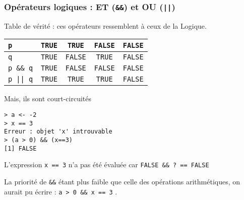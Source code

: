 \documentclass[10pt]{beamer}
\newcommand{\T}{\texttt{TRUE}}
\newcommand{\F}{\texttt{FALSE}}
\begin{document}


\begin{frame}[fragile]
  \frametitle{Opérateurs logiques : ET (\texttt{\&\&}) et OU (\texttt{||})}
  \begin{block}{Table de vérité : ces opérateurs ressemblent à ceux de la Logique.}
  \begin{table}
    \centering
    \begin{tabular}{|l|c|c|c|c|}
      \hline
      \texttt{p}        & \T & \T & \F & \F \\ \hline
      \texttt{q}        & \T & \F & \T & \F \\ \hline
      \texttt{p \&\& q} & \T & \F & \F & \F \\ \hline
      \texttt{p || q} & \T & \T & \T & \F \\ \hline
    \end{tabular}
  \end{table}
\end{block}


\begin{block}{Mais, ils sont court-circuités}
  \begin{lstlisting}[style=block]
> a <- -2
> x == 3
Erreur : objet 'x' introuvable
> (a > 0) && (x==3)
[1] FALSE    
\end{lstlisting}
L'expression \lstinline[columns=fixed]{x == 3} n'a pas été évaluée car \texttt{FALSE \&\& ? == FALSE}

La priorité de \texttt{\&\&} étant plus faible que celle des opérations arithmétiques,
on aurait pu écrire : \lstinline[columns=fixed]{a > 0 && x == 3} .

\end{block}
\end{frame}
\end{document}
